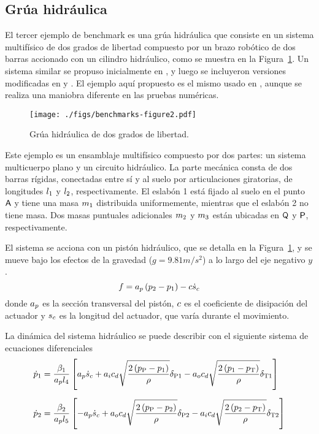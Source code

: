 \subsection{Grúa hidráulica}
\label{sec:grua}

El tercer ejemplo de benchmark es una grúa hidráulica que consiste en un sistema multifísico de dos grados de libertad compuesto por un brazo robótico de dos barras accionado con un cilindro hidráulico, como se muestra en la Figura~\ref{fig:GruaMono}.
Un sistema similar se propuso inicialmente en \cite{Naya2011}, y luego se incluyeron versiones modificadas en \cite{Peiret2018} y \cite{Rahikainen2020}.
El ejemplo aquí propuesto es el mismo usado en \cite{Peiret2018}, aunque se realiza una maniobra diferente en las pruebas numéricas.

\begin{figure}[ht!]\centering
	\texttt{[image: ./figs/benchmarks-figure2.pdf]}
	\caption{Grúa hidráulica de dos grados de libertad.}
	\label{fig:GruaMono}
\end{figure}

Este ejemplo es un ensamblaje multifísico compuesto por dos partes: un sistema multicuerpo plano y un circuito hidráulico.
La parte mecánica consta de dos barras rígidas, conectadas entre sí y al suelo por articulaciones giratorias, de longitudes $l_1$ y $l_2$, respectivamente.
El eslabón 1 está fijado al suelo en el punto $\mathsf{ A }$ y tiene una masa $m_1$ distribuida uniformemente, mientras que el eslabón 2 no tiene masa.
Dos masas puntuales adicionales $m_2$ y $m_3$ están ubicadas en $\mathsf{ Q }$ y $\mathsf{ P }$, respectivamente.

El sistema se acciona con un pistón hidráulico, que se detalla en la Figura~\ref{fig:GruaMono}, y se mueve bajo los efectos de la gravedad ($g=9.81\unit{m/s^2}$) a lo largo del eje negativo $y$ .
%
\begin{equation}
	f = a_p \left( p_2 - p_1 \right) - c \dot{s}_c
	\label{eq:cylinderForce}
\end{equation}
%
donde $a_p$ es la sección transversal del pistón, $c$ es el coeficiente de disipación del actuador y $s_c$ es la longitud del actuador, que varía durante el movimiento.

La dinámica del sistema hidráulico se puede describir con el siguiente sistema de ecuaciones diferenciales
%
\begin{align}
	\label{eq:hydODE1}
	\dot{p}_1 
	&=
	\dfrac{\beta_1}{a_p l_4}
	\left[ a_p \dot{s}_c 
		+ a_i c_d \sqrt{\dfrac{2 \left( p_{\text{P}} - p_1 \right)}{\rho}}\delta_{\text{P1}} 
		- a_o c_d \sqrt{\dfrac{2 \left( p_1 - p_{\text{T}} \right)}{\rho}}\delta_{\text{T1}} \right]
	\\[2mm]
	\dot{p}_2 
	&=
	\dfrac{\beta_2}{a_p l_5}
	\left[ - a_p \dot{s}_c 
		+ a_o c_d \sqrt{\dfrac{2 \left( p_{\text{P}} - p_2 \right)}{\rho}}\delta_{\text{P2}} 
		- a_i c_d \sqrt{\dfrac{2 \left( p_2 - p_{\text{T}} \right)}{\rho}}\delta_{\text{T2}} \right]
	\label{eq:hydODE2}
\end{align}

